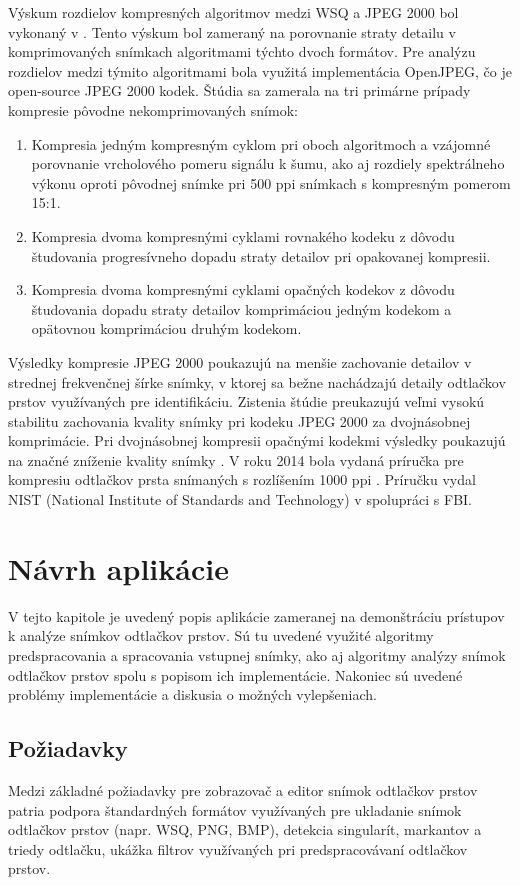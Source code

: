   Výskum rozdielov kompresných algoritmov medzi WSQ a JPEG 2000 bol vykonaný v \cite{Libert}. Tento výskum bol zameraný na porovnanie straty detailu
  v komprimovaných snímkach algoritmami týchto dvoch formátov. Pre analýzu rozdielov medzi týmito algoritmami bola využitá implementácia OpenJPEG,
  čo je open-source JPEG 2000 kodek. Štúdia sa zamerala na tri primárne prípady kompresie pôvodne nekomprimovaných snímok:
  \begin{enumerate}
    \item Kompresia jedným kompresným cyklom pri oboch algoritmoch a vzájomné porovnanie vrcholového pomeru signálu k šumu, ako aj rozdiely spektrálneho
          výkonu oproti pôvodnej snímke pri 500 ppi snímkach s kompresným pomerom 15:1.
    \item Kompresia dvoma kompresnými cyklami rovnakého kodeku z dôvodu študovania progresívneho dopadu straty detailov pri opakovanej kompresii.
    \item Kompresia dvoma kompresnými cyklami opačných kodekov z dôvodu študovania dopadu straty detailov komprimáciou jedným kodekom a opätovnou komprimáciou
          druhým kodekom.
  \end{enumerate}
  Výsledky kompresie JPEG 2000 poukazujú na menšie zachovanie detailov v strednej frekvenčnej šírke snímky, v ktorej sa bežne nachádzajú detaily odtlačkov
  prstov využívaných pre identifikáciu. Zistenia štúdie preukazujú veľmi vysokú stabilitu zachovania kvality snímky pri kodeku JPEG 2000 za dvojnásobnej
  komprimácie. Pri dvojnásobnej kompresii opačnými kodekmi výsledky poukazujú na značné zníženie kvality snímky \cite{Libert}. V roku 2014 bola vydaná
  príručka pre kompresiu odtlačkov prsta snímaných s rozlíšením 1000 ppi \cite{orandi2014guidance}. Príručku vydal NIST (National Institute of Standards
  and Technology) v spolupráci s FBI.

\chapter{Návrh aplikácie} \label{kap:navrh_appky}
  V tejto kapitole je uvedený popis aplikácie zameranej na demonštráciu prístupov k analýze snímkov odtlačkov prstov. Sú tu uvedené využité algoritmy
  predspracovania a spracovania vstupnej snímky, ako aj algoritmy analýzy snímok odtlačkov prstov spolu s popisom ich implementácie. Nakoniec sú uvedené
  problémy implementácie a diskusia o možných vylepšeniach.

  \section{Požiadavky}
  Medzi základné požiadavky pre zobrazovač a editor snímok odtlačkov prstov patria podpora štandardných formátov využívaných
  pre ukladanie snímok odtlačkov prstov (napr. WSQ, PNG, BMP),
  detekcia singularít, markantov a triedy odtlačku, ukážka filtrov využívaných pri predspracovávaní odtlačkov prstov.

